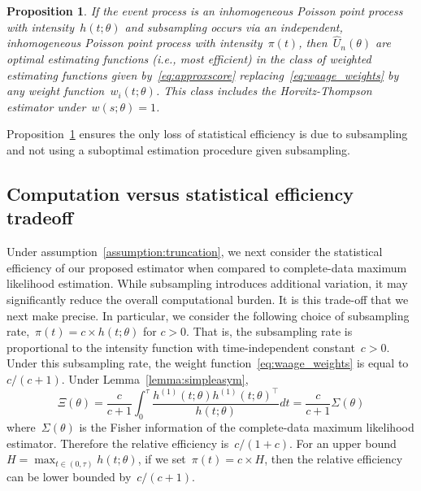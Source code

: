 \documentclass[12pt]{amsart}
\newtheorem{prop}[thm]{Proposition}
\begin{document}
\begin{prop} \normalfont
\label{prop:optimal}
If the event process is an inhomogeneous Poisson point process with
intensity~$h(t; \theta)$ and subsampling occurs via an independent,
inhomogeneous Poisson point process with intensity~$\pi (t)$,
then~$\hat U_n (\theta)$ are optimal estimating functions (i.e., most
efficient) in the class of weighted estimating functions given
by~\eqref{eq:approxscore} replacing~\eqref{eq:waage_weights} by any
weight function~$w_i (t; \theta)$. This class includes the
Horvitz-Thompson estimator under~$w(s; \theta) = 1$.
\end{prop}

\noindent Proposition~\ref{prop:optimal} ensures the only loss of
statistical efficiency is due to subsampling and not using a
suboptimal estimation procedure given subsampling.

\subsection{Computation versus statistical efficiency tradeoff}

Under assumption~\ref{assumption:truncation}, we next consider the
statistical efficiency of our proposed estimator when compared to
complete-data maximum likelihood estimation.
While subsampling introduces additional variation, it may
significantly reduce the overall computational burden. It is this
trade-off that we next make precise.
In particular, we consider the following choice of subsampling
rate,~$\pi(t) = c \times h(t; \theta)$ for $c>0$. That is, the
subsampling rate is proportional to the intensity function with
time-independent constant~$c > 0$.
Under this subsampling rate, the weight
function~\eqref{eq:waage_weights} is equal to $c / (c+1)$.  
Under Lemma~\ref{lemma:simpleasym}, 
\[
\Xi (\theta) = \frac{c}{c+1} \int_0^\tau \frac{ h^{(1)} (t; \theta)
  h^{(1)} (t; \theta)^\top}{h (t; \theta)} dt = \frac{c}{c+1} \Sigma (\theta)
\]
where~$\Sigma(\theta)$ is the Fisher information of the complete-data 
maximum likelihood estimator.
Therefore the relative efficiency is~$c/(1+c)$. For an upper bound~$H
= \max_{t \in (0,\tau)} h(t;\theta)$, if we set~$\pi (t) = c \times
H$, then the relative efficiency can be lower bounded by~$c / (c+1)$.
\end{document}
